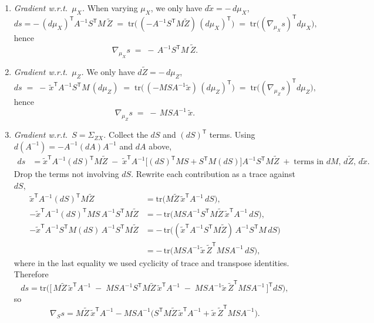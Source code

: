 \documentclass[12pt]{article}
\newcommand{\T}{\mathsf{T}} %
\begin{document}
\begin{enumerate}
\item \textit{Gradient w.r.t.\ $\mu_X$.}
When varying $\mu_X$, we only have $d\tilde x = -\,d\mu_X$,
\[
ds = -\,(d\mu_X)^{\T} A^{-1}S^{\T}M\,\widetilde Z
\;=\; \mathrm{tr}\!\big(\,(-A^{-1}S^{\T}M\widetilde Z)\,(d\mu_X)^{\T}\big)
\;=\; \mathrm{tr}\!\big((\nabla_{\mu_X}s)^{\T} d\mu_X\big),
\]
hence
\[
\boxed{\;\nabla_{\mu_X} s \;=\; -\,A^{-1}S^{\T}M\,\widetilde Z.\;}
\]

\item \textit{Gradient w.r.t.\ $\mu_Z$.}
We only have $d\widetilde Z=-\,d\mu_Z$,
\[
ds \;=\; -\,\tilde x^{\T}A^{-1}S^{\T}M\,(d\mu_Z)
\;=\; \mathrm{tr}\!\big(\,(-M S A^{-1}\tilde x)\,(d\mu_Z)^{\T}\big)
\;=\; \mathrm{tr}\!\big((\nabla_{\mu_Z}s)^{\T} d\mu_Z\big),
\]
hence
\[
\boxed{\;\nabla_{\mu_Z} s \;=\; -\,M S A^{-1}\,\tilde x.\;}
\]

\item \textit{Gradient w.r.t.\ $S=\Sigma_{ZX}$.}
Collect the $dS$ and $(dS)^{\T}$ terms. Using $d(A^{-1})=-A^{-1}(dA)A^{-1}$ and $dA$ above,
\begin{align*}
ds
&= \tilde x^{\T} A^{-1} (dS)^{\T}M\widetilde Z
\;-\;\tilde x^{\T} A^{-1}\Big[(dS)^{\T}MS+S^{\T}M(dS)\Big]A^{-1} S^{\T}M\widetilde Z
\;+\; \text{terms in }dM,\,d\widetilde Z,\,d\tilde x.
\end{align*}
Drop the terms not involving $dS$. Rewrite each contribution as a trace against $dS$,
\begin{align*}
\tilde x^{\T} A^{-1} (dS)^{\T}M\widetilde Z
&= \mathrm{tr}\!\big(M\widetilde Z\,\tilde x^{\T}A^{-1}\,dS\big),\\
-\tilde x^{\T} A^{-1} (dS)^{\T}MS\,A^{-1} S^{\T}M\widetilde Z
&= -\,\mathrm{tr}\!\big(MS A^{-1} S^{\T}M\widetilde Z\,\tilde x^{\T}A^{-1}\,dS\big),\\
-\tilde x^{\T} A^{-1} S^{\T}M(dS)\,A^{-1} S^{\T}M\widetilde Z
&= -\,\mathrm{tr}\!\big((\tilde x^{\T}A^{-1} S^{\T}M\widetilde Z)\, A^{-1} S^{\T}M\,dS\big) \\
&= -\,\mathrm{tr}\!\big(M S A^{-1}\tilde x\,\widetilde Z^{\T} M S A^{-1}\,dS\big),
\end{align*}
where in the last equality we used cyclicity of trace and transpose identities.
Therefore
\[
ds
= \mathrm{tr}\!\Big(
\big[\,M\widetilde Z\,\tilde x^{\T}A^{-1}
\;-\;M S A^{-1} S^{\T}M\widetilde Z\,\tilde x^{\T}A^{-1}
\;-\;M S A^{-1}\tilde x\,\widetilde Z^{\T} M S A^{-1}\,\big]^{\T} dS\Big),
\]
so
\[
\boxed{\;\nabla_{S} s
= M\widetilde Z\,\tilde x^{\T}A^{-1}
- M S A^{-1}\Big(S^{\T}M\widetilde Z\,\tilde x^{\T}A^{-1}+\tilde x\,\widetilde Z^{\T} M S A^{-1}\Big).\;}
\]


\end{enumerate}
\end{document}
